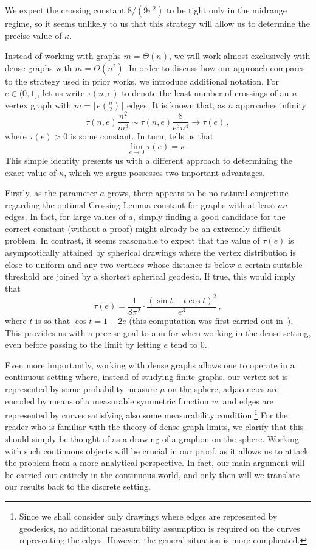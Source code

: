 \documentclass[reqno, 11pt]{amsart}
\theoremstyle{definition}
\begin{document}
We expect the crossing constant $8/(9\pi^2)$ to be tight only in the midrange regime, so it seems unlikely to us that this strategy will allow us to determine the precise value of $\kappa$.  

Instead of working with graphs $m = \Theta(n)$, we will work almost exclusively with dense graphs with $m = \Theta(n^2)$. In order to discuss how our approach compares to the strategy used in prior works, we introduce additional notation. For $e\in(0,1]$, let us write $\tau(n,e)$ to denote the least number of crossings of an $n$-vertex graph with $m= \lceil e\binom{n}{2}\rceil$ edges. It is known that, as $n$ approaches infinity
\[\tau(n,e)\frac{n^2}{m^3}\sim\tau(n,e)\frac{8}{e^3n^4} \to \tau(e)\,,\]
where $\tau(e) > 0$ is some constant. In turn,  tells us that \[\lim_{e\rightarrow0}\tau(e)=\kappa\,.\]
This simple identity presents us with a different approach to determining the exact value of $\kappa$, which we argue possesses two important advantages.

Firstly, as the parameter $a$ grows, there appears to be no natural conjecture regarding the optimal Crossing Lemma constant for graphs with at least $an$ edges. In fact, for large values of $a$, simply finding a good candidate for the correct constant (without a proof) might already be an extremely difficult problem. In contrast, it seems reasonable to expect that the value of $\tau(e)$ is asymptotically attained by spherical drawings where the vertex distribution is close to uniform and any two vertices whose distance is below a certain suitable threshold are joined by a shortest spherical geodesic. If true, this would imply that \[\tau(e)=\frac{1}{8\pi^2}\cdot\frac
{(\sin t-t\cos t)^2}{e^3}\,,\] where $t$ is so that $\cos t=1-2e$ (this computation was first carried out in~\cite{CzabarkaSinggihSzekelyWang}). This provides us with a precise goal to aim for when working in the dense setting, even before passing to the limit by letting $e$ tend to $0$.

Even more importantly, working with dense graphs allows one to operate in a continuous setting where, instead of studying finite graphs, our vertex set is represented by some probability measure $\mu$ on the sphere, adjacencies are encoded by means of a measurable symmetric function $w$, and edges are represented by curves satisfying also some measurability condition.\footnote{Since we shall consider only drawings where edges are represented by geodesics, no additional measurability assumption is required on the curves representing the edges. However, the general situation is more complicated.} For the reader who is familiar with the theory of dense graph limits, we clarify that this should simply be thought of as a drawing of a graphon on the sphere. Working with such continuous objects will be crucial in our proof, as it allows us to attack the problem from a more analytical perspective. In fact, our main argument will be carried out entirely in the continuous world, and only then will we translate our results back to the discrete setting. 
\end{document}

